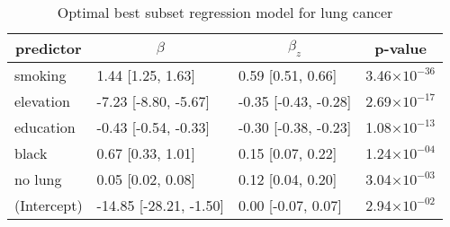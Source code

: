%
\begin{table}[!tbp]
\caption{Optimal best subset regression model for lung cancer\label{SI_tab:lung}} 
\begin{center}
\begin{tabular}{llll}
\hline\hline
\multicolumn{1}{c}{predictor}&\multicolumn{1}{c}{$\beta$}&\multicolumn{1}{c}{$\beta_z$}&\multicolumn{1}{c}{p-value}\tabularnewline
\hline
smoking&1.44 [1.25, 1.63]&0.59 [0.51, 0.66]&3.46$\times10^{-36}$\tabularnewline
elevation&-7.23 [-8.80, -5.67]&-0.35 [-0.43, -0.28]&2.69$\times10^{-17}$\tabularnewline
education&-0.43 [-0.54, -0.33]&-0.30 [-0.38, -0.23]&1.08$\times10^{-13}$\tabularnewline
black&0.67 [0.33, 1.01]&0.15 [0.07, 0.22]&1.24$\times10^{-04}$\tabularnewline
no lung&0.05 [0.02, 0.08]&0.12 [0.04, 0.20]&3.04$\times10^{-03}$\tabularnewline
(Intercept)&-14.85 [-28.21, -1.50]&0.00 [-0.07, 0.07]&2.94$\times10^{-02}$\tabularnewline
\hline
\end{tabular}
\end{center}
\end{table}

